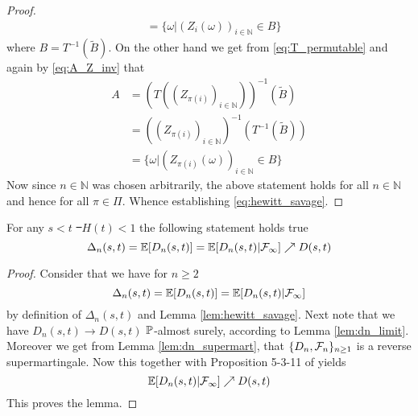 \begin{lemma}
\begin{proof}
\begin{align*}
		&= \{\omega | (Z_i(\omega))_{i\in\mathbb{N}} \in B\}
		\end{align*}
		where $B = T^{-1}(\tilde{B})$. On the other hand we get from \eqref{eq:T_permutable} and again by \eqref{eq:A_Z_inv} that 
		\begin{align*}
		A &= (T((Z_{\pi(i)})_{i\in\mathbb{N}}))^{-1}(\tilde{B}) \\
		&= ((Z_{\pi(i)})_{i\in\mathbb{N}})^{-1}(T^{-1}(\tilde{B}))\\
		&= \{\omega | (Z_{\pi(i)}(\omega))_{i\in\mathbb{N}} \in B\}
		\end{align*}
		Now since $n\in\mathbb{N}$ was chosen arbitrarily, the above statement holds for all $n\in\mathbb{N}$ and hence for all $\pi\in\Pi$. Whence establishing \eqref{eq:hewitt_savage}.
	\end{proof}
\end{lemma}
%
\begin{lemma}For any $s<t$ \st\ $H(t)<1$ the following statement holds true
	$$\Delta_{n}(s,t) = \E[D_n(s,t)] = \E[D_n(s,t)|\F_\infty] \nearrow D(s,t)$$
	\label{lem:neveu}
	\begin{proof}
		Consider that we have for $n\geq 2$
		$$\Delta_{n}(s,t) = \E[D_n(s,t)] = \E[D_n(s,t)|\F_\infty] $$
		by definition of $\Delta_{n}(s,t)$ and Lemma \ref{lem:hewitt_savage}. Next note that we have $D_n(s,t) \to D(s,t)$ $\P$-almost surely, according to Lemma \ref{lem:dn_limit}. Moreover we get from Lemma \ref{lem:dn_supermart}, that $\{D_n,\F_n\}_{n\geq 1}$ is a reverse supermartingale. Now this together with Proposition 5-3-11 of \cite{neveu1975discrete} yields
		$$\E[D_n(s,t)|\F_\infty] \nearrow D(s,t)$$
		This proves the lemma.
	\end{proof}
\end{lemma}
%
%
%
%
